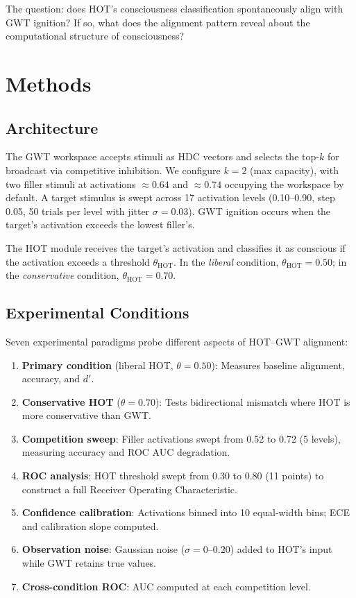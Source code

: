 \documentclass[10pt,letterpaper]{article}
\newcommand{\dprime}{d'}
\begin{document}
The question: does HOT's consciousness classification spontaneously
align with GWT ignition?  If so, what does the alignment pattern reveal
about the computational structure of consciousness?


\section{Methods}

\subsection{Architecture}

The GWT workspace accepts stimuli as HDC vectors and selects the top-$k$
for broadcast via competitive inhibition.  We configure $k = 2$
(max capacity), with two filler stimuli at activations $\approx 0.64$
and $\approx 0.74$ occupying the workspace by default.  A target
stimulus is swept across 17 activation levels (0.10--0.90, step 0.05,
50 trials per level with jitter $\sigma = 0.03$).  GWT ignition occurs
when the target's activation exceeds the lowest filler's.

The HOT module receives the target's activation and classifies it as
conscious if the activation exceeds a threshold $\theta_{\text{HOT}}$.
In the \emph{liberal} condition, $\theta_{\text{HOT}} = 0.50$; in the
\emph{conservative} condition, $\theta_{\text{HOT}} = 0.70$.

\subsection{Experimental Conditions}

Seven experimental paradigms probe different aspects of HOT--GWT
alignment:

\begin{enumerate}
\item \textbf{Primary condition} (liberal HOT, $\theta = 0.50$):
  Measures baseline alignment, accuracy, and $\dprime$.
\item \textbf{Conservative HOT} ($\theta = 0.70$): Tests bidirectional
  mismatch where HOT is more conservative than GWT.
\item \textbf{Competition sweep}: Filler activations swept from 0.52
  to 0.72 (5 levels), measuring accuracy and ROC AUC degradation.
\item \textbf{ROC analysis}: HOT threshold swept from 0.30 to 0.80
  (11 points) to construct a full Receiver Operating Characteristic.
\item \textbf{Confidence calibration}: Activations binned into 10
  equal-width bins; ECE and calibration slope computed.
\item \textbf{Observation noise}: Gaussian noise ($\sigma = 0$--$0.20$)
  added to HOT's input while GWT retains true values.
\item \textbf{Cross-condition ROC}: AUC computed at each competition level.
\end{enumerate}
\end{document}
